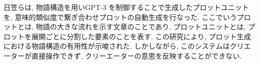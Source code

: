
日笠ら\cite{ref:Higasa23}は, 物語構造を用いGPT-3\cite{ref:Brown20} を制御することで生成したプロットユニットを, 意味的類似度で繋ぎ合わせプロットの自動生成を行なった. ここでいうプロットとは, 物語の大きな流れを示す文章のことであり, プロットユニットとは, プロットを展開ごとに分割した要素のことを表す. この研究により, プロット生成における物語構造の有用性が示唆された. しかしながら, このシステムはクリエーターが直接操作できず, クリーエーターの意思を反映することができない.


